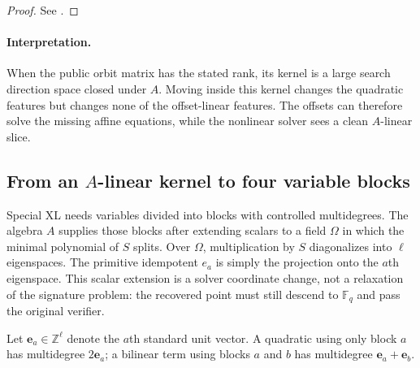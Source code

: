 \documentclass[11pt]{article}
\newcommand{\F}{\mathbb F}
\begin{document}
\begin{proof}
See .
\end{proof}

\paragraph{Interpretation.}
When the public orbit matrix has the stated rank, its kernel is a large search
direction space closed under $A$.  Moving inside this kernel changes the
quadratic features but changes none of the offset-linear features.  The
offsets can therefore solve the missing affine equations, while the nonlinear
solver sees a clean $A$-linear slice.

\begin{center}
\end{center}

\subsection{From an \texorpdfstring{$A$}{A}-linear kernel to four variable blocks}

Special XL needs variables divided into blocks with controlled
multidegrees.  The algebra $A$ supplies those blocks after extending scalars to
a field $\Omega$ in which the minimal polynomial of $S$ splits.  Over
$\Omega$, multiplication by $S$ diagonalizes into $\ell$ eigenspaces.  The
primitive idempotent $e_a$ is simply the projection onto the $a$th eigenspace.
This scalar extension is a solver coordinate change, not a relaxation of the
signature problem: the recovered point must still descend to $\F_q$ and pass
the original verifier.

Let $\mathbf e_a\in\mathbb Z^\ell$ denote the $a$th standard unit vector.  A
quadratic using only block $a$ has multidegree $2\mathbf e_a$; a bilinear term
using blocks $a$ and $b$ has multidegree
$\mathbf e_a+\mathbf e_b$.
\end{document}
